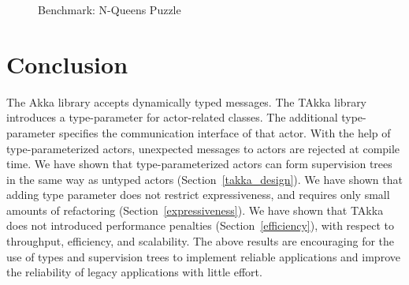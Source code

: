 \begin{figure}[!h]
     \begin{center}
    \end{center}
    \caption{Benchmark: N-Queens Puzzle}
   \label{nqueens_efficiency}
   \vspace{-10pt}
\end{figure}


\section{Conclusion}
\label{conclusion}

The Akka library accepts dynamically typed messages.  The TAkka
library introduces a type-parameter for actor-related classes. The additional 
type-parameter specifies the communication interface of 
that actor.  With the help of type-parameterized actors, unexpected 
messages to actors are rejected at compile time.
We have shown that type-parameterized 
actors can form supervision trees in the same way as untyped actors (Section~\ref{takka_design}).
We have shown that
adding type parameter does not restrict expressiveness, and requires
only small amounts of refactoring (Section~\ref{expressiveness}).  We have
shown that TAkka does not introduced performance penalties (Section~\ref{efficiency}), 
with respect to throughput, efficiency, and scalability.  The above results are encouraging for the 
use of types and supervision trees to implement reliable applications and improve the 
reliability of legacy applications with little effort.  
